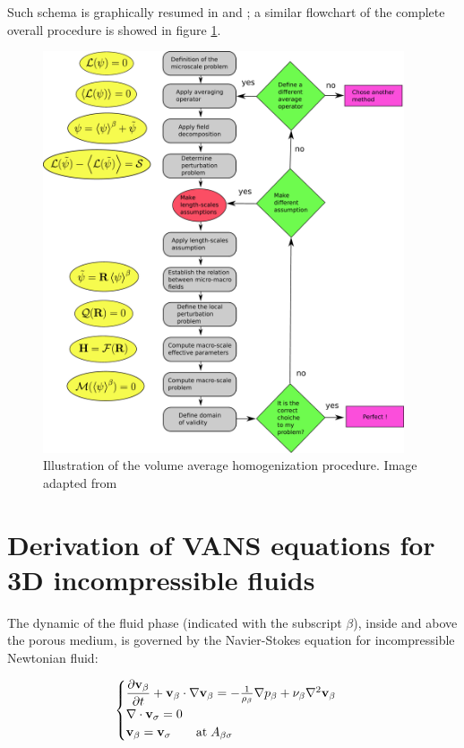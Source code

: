 Such schema is graphically resumed in \citet{paez2017macroscopic} and \citet{davit2013homogenization}; a similar flowchart of the complete overall procedure is showed in figure \ref{fig:schema_vans_homo}.

\begin{figure}[h!]
	\centering
	\includegraphics[width=0.95\textwidth,height=0.95\textheight,keepaspectratio]{chapter_2/figure/schema}
	\caption{Illustration of the volume average homogenization procedure. Image adapted from \citet{davit2013homogenization}}
	\label{fig:schema_vans_homo}
\end{figure}

\section{Derivation of VANS equations for 3D incompressible fluids}
The dynamic of the fluid phase (indicated with the subscript $\beta$), inside and above the porous medium, is governed by the Navier-Stokes equation for incompressible Newtonian fluid:

\begin{eqnarray}
	\begin{cases}
		\dfrac{\partial \textbf{v}_{\beta}}{\partial t} + \textbf{v}_{\beta} \cdot \nabla \textbf{v}_{\beta} = -\frac{1}{\rho_{\beta}} \nabla p_{\beta} + \nu_{\beta} \nabla^2  \textbf{v}_{\beta}  \\
		\nabla \cdot \textbf{v}_{\sigma} = 0 \\
		\textbf{v}_{\beta} = \textbf{v}_{\sigma} \qquad \text{at} \; A_{\beta\sigma}
	\end{cases}
\label{eq:NS}
\end{eqnarray}\\

